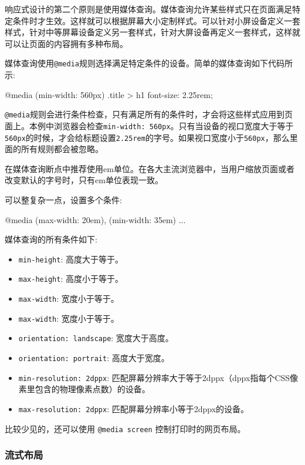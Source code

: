 响应式设计的第二个原则是使用媒体查询。媒体查询允许某些样式只在页面满足特定条件时才生效。这样就可以根据屏幕大小定制样式。可以针对小屏设备定义一套样式，针对中等屏幕设备定义另一套样式，针对大屏设备再定义一套样式，这样就可以让页面的内容拥有多种布局。

媒体查询使用\texttt{@media}规则选择满足特定条件的设备。简单的媒体查询如下代码所示:

\begin{HTML}
@media (min-width: 560px) {  
    .title > h1 {
        font-size: 2.25rem;  
    } 
} 
\end{HTML}

\texttt{@media}规则会进行条件检查，只有满足所有的条件时，才会将这些样式应用到页面上。本例中浏览器会检查\texttt{min-width: 560px}。只有当设备的视口宽度大于等于\texttt{560px}的时候，才会给标题设置\texttt{2.25rem}的字号。如果视口宽度小于\texttt{560px}，那么里面的所有规则都会被忽略。

在媒体查询断点中推荐使用em单位。在各大主流浏览器中，当用户缩放页面或者改变默认的字号时，只有em单位表现一致。

可以整复杂一点，设置多个条件:

\begin{HTML}
@media (max-width: 20em), (min-width: 35em) { ... }
\end{HTML}

媒体查询的所有条件如下:
\begin{itemize}
    \item \texttt{min-height}: 高度大于等于。
    \item \texttt{max-height}: 高度小于等于。
    \item \texttt{max-width}: 宽度小于等于。
    \item \texttt{max-width}: 宽度小于等于。
    \item \texttt{orientation: landscape}: 宽度大于高度。
    \item \texttt{orientation: portrait}: 高度大于宽度。
    \item \texttt{min-resolution: 2dppx}: 匹配屏幕分辨率大于等于2dppx（dppx指每个CSS像素里包含的物理像素点数）的设备。
    \item \texttt{max-resolution: 2dppx}: 匹配屏幕分辨率小等于2dppx的设备。
\end{itemize}

比较少见的，还可以使用 \texttt{@media screen} 控制打印时的网页布局。

\subsubsection*{流式布局}

